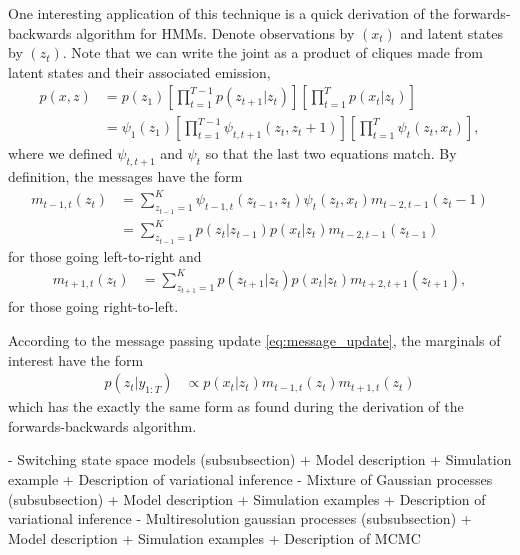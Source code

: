 \documentclass{article}
\begin{document}
One interesting application of this technique is a quick derivation of the
forwards-backwards algorithm for HMMs. Denote observations by $\left(x_t\right)$
and latent states by $\left(z_t\right)$. Note that we can write the joint as a
product of cliques made from latent states and their associated emission,
\begin{align*}
  p\left(x, z\right) &= p\left(z_1\right) \left[\prod_{t = 1}^{T - 1} p\left(z_{t + 1} \vert z_t\right)\right]
  \left[\prod_{t = 1}^{T} p\left(x_t \vert z_t\right)\right] \\
    &= \psi_1\left(z_1\right) \left[\prod_{t = 1}^{T - 1} \psi_{t, t + 1}\left(z_t, z_t +
    1\right)\right] \left[\prod_{t = 1}^{T} \psi_t\left(z_t, x_t\right)\right],
\end{align*}
where we defined $\psi_{t, t + 1}$ and $\psi_t$ so that the last two equations
match. By definition, the messages have the form
\begin{align*}
  m_{t - 1, t}\left(z_{t}\right) &= \sum_{z_{t - 1} = 1}^{K} \psi_{t - 1, t}\left(z_{t - 1}, z_t\right) \psi_{t}\left(z_t, x_t\right) m_{t - 2, t - 1}\left(z_t - 1\right) \\
  &= \sum_{z_{t - 1} = 1}^{K} p\left(z_t \vert z_{t - 1}\right)p\left(x_t \vert z_t\right)m_{t - 2, t - 1}\left(z_{t - 1}\right)
\end{align*}
for those going left-to-right and
\begin{align*}
  m_{t + 1, t}\left(z_t\right) &= \sum_{z_{t + 1} = 1}^{K} p\left(z_{t + 1}\vert z_t\right)p\left(x_t \vert z_t\right)m_{t + 2, t + 1}\left(z_{t + 1}\right),
\end{align*}
for those going right-to-left.

According to the message passing update \ref{eq:message_update}, the marginals
of interest have the form
\begin{align*}
  p\left(z_{t} \vert y_{1:T}\right) &\propto p\left(x_t \vert z_t\right) m_{t - 1, t}\left(z_t\right)m_{t + 1, t}\left(z_t\right)
\end{align*}
which has the exactly the same form as found during the derivation of the
forwards-backwards algorithm.

- Switching state space models (subsubsection)
   + Model description
   + Simulation example
   + Description of variational inference
- Mixture of Gaussian processes (subsubsection)
  + Model description
  + Simulation examples
  + Description of variational inference
- Multiresolution gaussian processes (subsubsection)
  + Model description
  + Simulation examples
  + Description of MCMC
\end{document}

